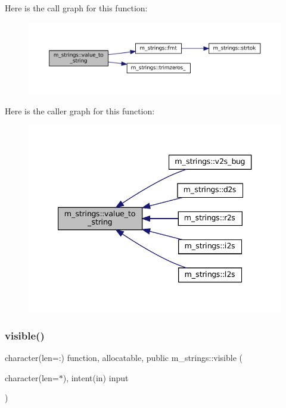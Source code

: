 Here is the call graph for this function\+:
\nopagebreak
\begin{figure}[H]
\begin{center}
\leavevmode
\includegraphics[width=350pt]{namespacem__strings_a5dcd73626c8909c12f8ea29028927a88_cgraph}
\end{center}
\end{figure}
Here is the caller graph for this function\+:
\nopagebreak
\begin{figure}[H]
\begin{center}
\leavevmode
\includegraphics[width=340pt]{namespacem__strings_a5dcd73626c8909c12f8ea29028927a88_icgraph}
\end{center}
\end{figure}
\mbox{\label{namespacem__strings_a791e24ceb690010fd42a6c1f48311b55}} 
\subsubsection{\texorpdfstring{visible()}{visible()}}
{\footnotesize\ttfamily character(len=\+:) function, allocatable, public m\+\_\+strings\+::visible (\begin{DoxyParamCaption}\item[{character(len=$\ast$), intent(in)}]{input }\end{DoxyParamCaption})}



